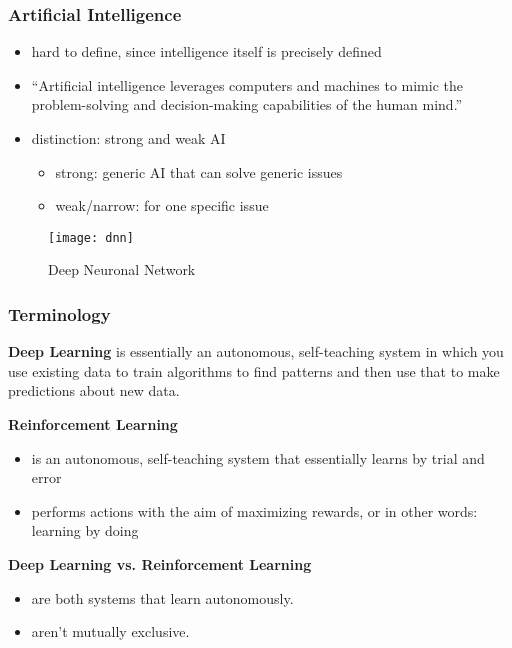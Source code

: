 \begin{frame}
    \frametitle{Artificial Intelligence}

    \begin{itemize}
        \item hard to define, since intelligence itself is precisely defined
        \item ``Artificial intelligence leverages computers and machines to mimic the problem-solving and decision-making capabilities of the human mind.''
        \item distinction: strong and weak AI
        \begin{itemize}
            \item strong: generic AI that can solve generic issues
            \item weak/narrow: for one specific issue
        \end{itemize}
    \end{itemize}

    \begin{figure}
        \texttt{[image: dnn]}
        \caption{Deep Neuronal Network}
        \label{fig:dnn}
    \end{figure}
\end{frame}

\begin{frame}
    \frametitle{Terminology}
    \textbf{Deep Learning}
    is essentially an autonomous, self-teaching system in which you use existing data to train algorithms
    to find patterns and then use that to make predictions about new data.

    \textbf{Reinforcement Learning}
    \begin{itemize}
        \item is an autonomous, self-teaching system that essentially learns by trial and error
        \item performs actions with the aim of maximizing rewards, or in other words: learning by doing
    \end{itemize}

    \textbf{Deep Learning vs. Reinforcement Learning}
    \begin{itemize}
        \item are both systems that learn autonomously.
        \item aren't mutually exclusive.
    \end{itemize}
\end{frame}

